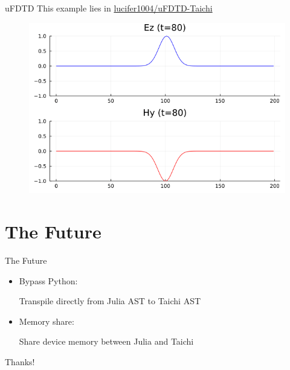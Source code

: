 \documentclass{beamer}
\begin{document}
\begin{frame}{uFDTD}
    This example lies in \href{https://github.com/lucifer1004/uFDTD-Taichi}{lucifer1004/uFDTD-Taichi}

    \begin{figure}[htpb]
        \begin{center}
            \includegraphics[width=.8\linewidth]{pic/1d_tfsf.png}
        \end{center}
    \end{figure}
\end{frame}

\section{The Future}
\begin{frame}{The Future}
    \begin{itemize}
        \item Bypass Python:

              Transpile directly from Julia AST to Taichi AST
        \item Memory share:

              Share device memory between Julia and Taichi
    \end{itemize}
\end{frame}

\begin{frame}
    \begin{center}
        {\Huge\calligra Thanks!}
    \end{center}
\end{frame}
\end{document}
